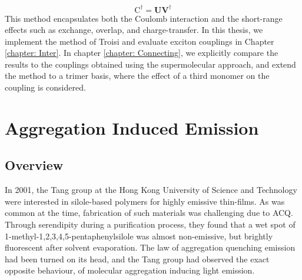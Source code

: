 \begin{equation}
    \bm{\mathrm{C}}^{\dag}=\bm{UV}^{\dag}
\end{equation}
This method encapsulates both the Coulomb interaction and the short-range effects such as exchange, overlap, and charge-transfer.\cite{Arago2015,Arago2016,Fornari2017} In this thesis, we implement the method of Troisi and evaluate exciton couplings in Chapter \ref{chapter: Inter}.  In chapter \ref{chapter: Connecting}, we explicitly compare the results to the couplings obtained using the supermolecular approach, and extend the method to a trimer basis, where the effect of a third monomer on the coupling is considered.











\section{Aggregation Induced Emission}\label{section: lom AIE}
\subsection{Overview}
In 2001, the Tang group at the Hong Kong University of Science and Technology were interested in silole-based polymers for highly emissive thin-films. As was common at the time, fabrication of such materials was challenging due to \ac{ACQ}. Through serendipity during a purification process, they found that a wet spot of 1-methyl-1,2,3,4,5-pentaphenylsilole was almost non-emissive, but brightly fluorescent after solvent evaporation.\cite{Luo2001} The law of aggregation quenching emission had been turned on its head, and the Tang group had observed the exact opposite behaviour, of molecular aggregation inducing light emission. 

